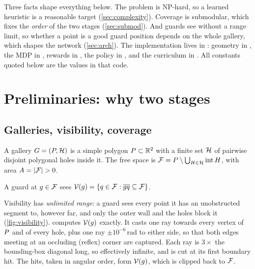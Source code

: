 \documentclass[11pt,a4paper]{article}
\begin{document}
Three facts shape everything below. The problem is NP-hard, so a learned heuristic is a
reasonable target (\cref{sec:complexity}). Coverage is submodular, which fixes the
\emph{order} of the two stages (\cref{sec:submod}). And guards see without a range limit,
so whether a point is a good guard position depends on the whole gallery, which shapes the
network (\cref{sec:arch}). The implementation lives in : geometry in
, the MDP in , rewards in , the policy in
, and the curriculum in . All constants quoted below are the
values in that code.

\section{Preliminaries: why two stages}\label{sec:prelim}

\subsection{Galleries, visibility, coverage}

\begin{definition}
A gallery $G = (P, \mathcal{H})$ is a simple polygon $P \subset \mathbb{R}^2$ with a
finite set $\mathcal{H}$ of pairwise disjoint polygonal holes inside it. The free space is
$\mathcal{F} = P \setminus \bigcup_{H \in \mathcal{H}} \operatorname{int} H$, with area
$A = \lvert \mathcal{F} \rvert > 0$.
\end{definition}

\begin{definition}
A guard at $g \in \mathcal{F}$ sees $\mathcal{V}(g) = \{ q \in \mathcal{F} : \overline{gq} \subseteq \mathcal{F} \}$.
\end{definition}

Visibility has \emph{unlimited range}: a guard sees every point it has an unobstructed
segment to, however far, and only the outer wall and the holes block it
(\cref{fig:visibility}).  computes $\mathcal{V}(g)$ exactly. It
casts one ray towards every vertex of $P$ and of every hole, plus one ray
$\pm 10^{-6}$\,rad to either side, so that both edges meeting at an occluding (reflex) corner
are captured. Each ray is $3\times$ the bounding-box diagonal long, so effectively infinite,
and is cut at its first boundary hit. The hits, taken in angular order, form $\mathcal{V}(g)$,
which is clipped back to $\mathcal{F}$.
\end{document}
